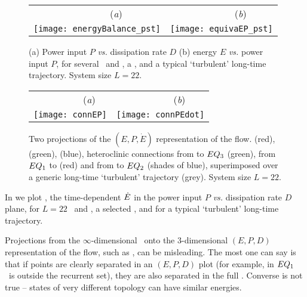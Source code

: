 \begin{figure}[t]
\begin{center}
 \begin{tabular}{cc}
        ~~~~~~~~(\textit{a})                        &   ~~~~~~~~(\textit{b}) \\
    \texttt{[image: energyBalance\_pst]}
    & \texttt{[image: equivaEP\_pst]}

  \end{tabular}
\end{center}
\caption{
(a) Power input $P$ {\em vs.}
dissipation rate $D$
(b) energy $E$  {\em vs.}
power input $P$,   for several  \eqva\ and \reqva,
a \rpo, and a typical `turbulent' long-time trajectory.
System size $L=22$.
        }
\label{f:drivedrag}
\end{figure}

\begin{figure}[t]
\begin{center}
 \begin{tabular}{cc}
        ~~~~~~~~(\textit{a})                        &   ~~~~~~~~(\textit{b}) \\
    \texttt{[image: connEP]}
     & \texttt{[image: connPEdot]}
 \end{tabular}
\end{center}
\caption{
Two projections of the $(E,P,\dot{E})$ representation of the flow.
 (red),  (green),  (blue),
heteroclinic connections from  to $EQ_{3}$ (green),
from $EQ_{1}$ to  (red)
and from  to $EQ_{2}$ (shades of blue), superimposed over
a generic long-time `turbulent' trajectory (grey).
System size $L=22$.
        }
\label{f:drivedragConn}
\end{figure}

In  we plot , the time-dependent
$\dot{E}$ in the power input $P$ {\em vs.}
dissipation rate $D$ plane, for $L=22$ \eqva\ and \reqva,
a selected \rpo, and for a typical `turbulent' long-time
trajectory.

Projections from the $\infty$-dimensional \statesp\ onto the 3-dimensional
$(E,P,D)$ representation of the flow, such as
, can be misleading.
The most one can say is that if points are clearly separated in an
$(E,P,D)$ plot (for example, in 
$EQ_{1}$ \eqv\ is outside the recurrent set), they are also separated
in the full \statesp.  Converse is not true -- states of
very different topology can have similar energies.


